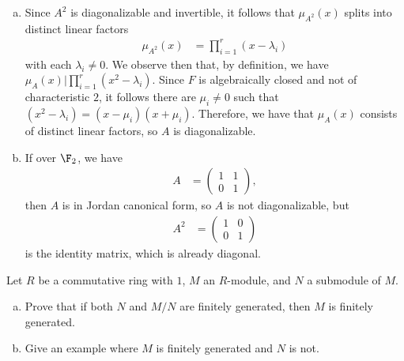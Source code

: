 \documentclass[10pt]{mypackage}
\begin{document}
\begin{solution}\hfill
  \begin{enumerate}[(a)]
    \item Since $A^2$ is diagonalizable and invertible, it follows that $\mu_{A^2}(x)$ splits into distinct linear factors
      \begin{align*}
        \mu_{A^2}(x) &= \prod_{i=1}^{r} \left( x-\lambda_i \right)
      \end{align*}
      with each $\lambda_i\neq 0$. We observe then that, by definition, we have $\mu_{A}(x) | \prod_{i=1}^{r} \left( x^2-\lambda_i \right)$. Since $F$ is algebraically closed and not of characteristic $2$, it follows there are $\mu_i\neq 0$ such that $\left( x^2-\lambda_i \right) = \left( x-\mu_i \right)\left( x+\mu_i \right)$. Therefore, we have that $\mu_A(x)$ consists of distinct linear factors, so $A$ is diagonalizable.
    \item If over $\F_2$, we have
      \begin{align*}
        A &= \begin{pmatrix}1 & 1 \\ 0 & 1\end{pmatrix},
      \end{align*}
      then $A$ is in Jordan canonical form, so $A$ is not diagonalizable, but
      \begin{align*}
        A^2 &= \begin{pmatrix}1 & 0 \\ 0 & 1\end{pmatrix}
      \end{align*}
      is the identity matrix, which is already diagonal.
  \end{enumerate}
\end{solution}
\begin{problem}[Problem 6]
  Let $R$ be a commutative ring with $1$, $M$ an $R$-module, and $N$ a submodule of $M$.
  \begin{enumerate}[(a)]
    \item Prove that if both $N$ and $M/N$ are finitely generated, then $M$ is finitely generated.
    \item Give an example where $M$ is finitely generated and $N$ is not.
  \end{enumerate}
\end{problem}
\end{document}
